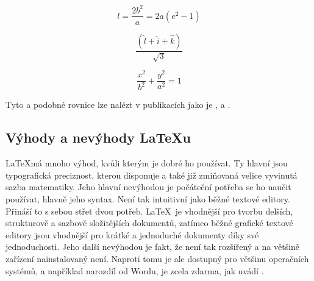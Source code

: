 \documentclass[a4paper, 11pt]{article}
\begin{document}
$$
l = \frac{2b^2}{a} = 2a(e^2-1)
$$

$$
\frac{(\hat{l} + \hat{i} + \hat{k})}{\sqrt{3}}
$$

$$
\frac{x^2}{b^2} + \frac{y^2}{a^2} = 1
$$


Tyto a podobné rovnice lze nalézt v publikacích jako je \cite{series}, \cite{frac} a \cite{matikacz}.

\subsection{Výhody a nevýhody \LaTeX u}
\LaTeX má mnoho výhod, kvůli kterým je dobré ho používat. Ty hlavní jsou typografická preciznost, kterou disponuje a také již zmiňovaná velice vyvinutá sazba matematiky. Jeho hlavní nevýhodou je  počáteční potřeba se ho naučit používat, hlavně jeho syntax. Není tak intuitivní jako běžné textové editory. Přináší to s sebou střet dvou potřeb. \LaTeX\ je vhodnější pro tvorbu delších, strukturově a sazbově složitějších dokumentů, zatímco běžné grafické textové editory jsou vhodnější pro krátké a jednoduché dokumenty díky své jednoduchosti. Jeho další nevýhodou je fakt, že není tak rozšířený a na většině zařízení nainstalovaný není. Naproti tomu je ale dostupný pro většinu operačních systémů, a například narozdíl od Wordu, je zcela zdarma, jak uvádí \cite{vyhody}.

\newpage
	
	\renewcommand{\refname}{Literatura}
	
\end{document}
